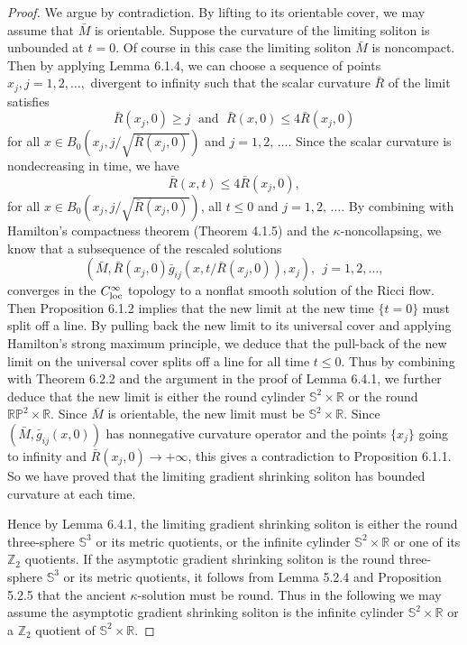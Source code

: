 \begin{proof}
We argue by contradiction. By lifting to its orientable cover, we
may assume that $\bar{M}$ is orientable. Suppose the curvature of
the limiting soliton is unbounded at $t=0$. Of course in this case
the limiting soliton $\bar{M}$ is noncompact. Then by applying
Lemma 6.1.4, we can choose a sequence of points $x_j, j = 1, 2,
\ldots,$ divergent to infinity such that the scalar curvature
$\bar{R}$ of the limit satisfies
$$
\bar{R}(x_j,0) \geq j\; \mbox{ and }\; \bar{R}(x,0) \leq
4\bar{R}(x_j,0)
$$
for all $x\in B_{0}(x_j,{j}/{\sqrt{\bar{R}(x_{j},0)}})$ and $j =
1, 2,\, \ldots$.  Since the scalar curvature is nondecreasing in
time, we have \begin{equation}
\bar{R}(x,t) \leq 4\bar{R}(x_j,0), %
\end{equation} for all $x\in B_{0}(x_j,{j}/{\sqrt{\bar{R}(x_{j},0)}})$, all
$t\leq 0$ and $j = 1, 2,\, \ldots$. By combining with Hamilton's
compactness theorem (Theorem 4.1.5) and the
$\kappa$-noncollapsing, we know that a subsequence of the rescaled
solutions
$$
(\bar{M},\bar{R}(x_j,0)\bar{g}_{ij}(x, t/\bar{R}(x_j,0)),x_j), \ \
j=1, 2, \ldots,
$$
converges in the $C^{\infty}_{\rm loc}$ topology to a nonflat
smooth solution of the Ricci flow. Then Proposition 6.1.2 implies
that the new limit at the new time $\{t = 0\}$ must split off a
line. By pulling back the new limit to its universal cover and
applying Hamilton's strong maximum principle, we deduce that the
pull-back of the new limit on the universal cover splits off a
line for all time $t \leq 0 $. Thus by combining with Theorem
6.2.2 and the argument in the proof of Lemma 6.4.1, we further
deduce that the new limit is either the round cylinder
$\mathbb{S}^2 \times \mathbb{R}$ or the round
$\mathbb{R}\mathbb{P}^2 \times \mathbb{R}$. Since $\bar{M}$ is
orientable, the new limit must be $\mathbb{S}^2 \times
\mathbb{R}$. Since $(\bar{M},\bar{g}_{ij}(x,0))$ has nonnegative
curvature operator and the points $\{ x_j \}$ going to infinity
and $ \bar{R}(x_j,0)\rightarrow +\infty $, this gives a
contradiction to Proposition 6.1.1. So we have proved that the
limiting gradient shrinking soliton has bounded curvature at each
time.

Hence by Lemma 6.4.1, the limiting gradient shrinking soliton is
either the round three-sphere $\mathbb{S}^3$ or its metric
quotients, or the infinite cylinder $\mathbb{S}^2\times
\mathbb{R}$ or one of its $\mathbb{Z}_2$ quotients. If the
asymptotic gradient shrinking soliton is the round three-sphere
$\mathbb{S}^3$ or its metric quotients, it follows from Lemma
5.2.4 and Proposition 5.2.5 that the ancient $\kappa$-solution
must be round. Thus in the following we may assume the asymptotic
gradient shrinking soliton is the infinite cylinder
$\mathbb{S}^2\times\mathbb{R}$ or a $\mathbb{Z}_2$ quotient of
$\mathbb{S}^2\times\mathbb{R}$.


\end{proof}
